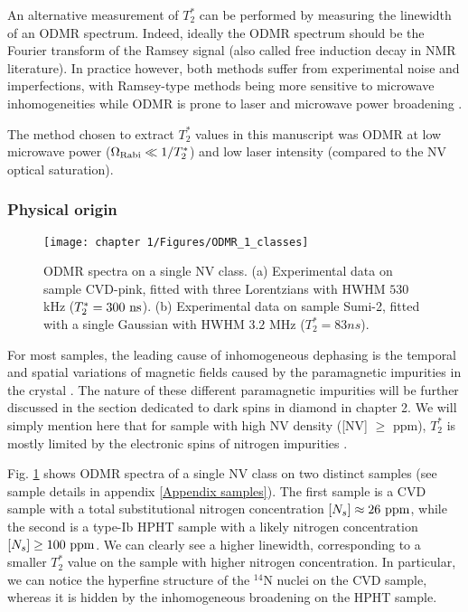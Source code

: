 \documentclass[a4paper, 11pt]{report}
\begin{document}
An alternative measurement of $T_2^*$ can be performed by measuring the linewidth of an ODMR spectrum. Indeed, ideally the ODMR spectrum should be the Fourier transform of the Ramsey signal (also called free induction decay in NMR literature). In practice however, both methods suffer from experimental noise and imperfections, with Ramsey-type methods being more sensitive to microwave inhomogeneities \citep{barry2020sensitivity} while ODMR is prone to laser and microwave power broadening \citep{dreau2011avoiding}. 

The method chosen to extract $T_2^*$ values in this manuscript was ODMR at low microwave power ($\Omega_{\rm Rabi} \ll 1/T_2^*$) and low laser intensity (compared to the NV optical saturation).

\subsubsection{Physical origin}

\begin{figure}[h!]
\centering
\texttt{[image: chapter 1/Figures/ODMR\_1\_classes]}
\caption{ODMR spectra on a single NV class. (a) Experimental data on sample CVD-pink, fitted with three Lorentzians with HWHM $530$ kHz ($T_2^*=300\ \rm ns$). (b) Experimental data on sample Sumi-2, fitted with a single Gaussian with HWHM $3.2$ MHz ($T_2^*=83 ns$).}
\label{ODMR 1 classe}
\end{figure}

For most samples, the leading cause of inhomogeneous dephasing is the temporal and spatial variations of magnetic fields caused by the paramagnetic impurities in the crystal \citep{barry2020sensitivity}. The nature of these different paramagnetic impurities will be further discussed in the section dedicated to dark spins in diamond in chapter 2. We will simply mention here that for sample with high NV density ([NV] $\geq$ ppm), $T_2^*$ is mostly limited by the electronic spins of nitrogen impurities \citep{bauch2018ultralong}.

Fig. \ref{ODMR 1 classe} shows ODMR spectra of a single NV class on two distinct samples (see sample details in appendix \ref{Appendix samples}). The first sample is a CVD sample with a total substitutional nitrogen  concentration $[N_s] \approx 26\ \rm ppm$, while the second is a type-Ib HPHT sample with a likely nitrogen concentration $[N_s] \geq 100\ \rm ppm$. We can clearly see a higher linewidth, corresponding to a smaller $T_2^*$ value on the sample with higher nitrogen concentration. In particular, we can notice the hyperfine structure of the $^{14}$N nuclei on the CVD sample, whereas it is hidden by the inhomogeneous broadening on the HPHT sample.
\end{document}
